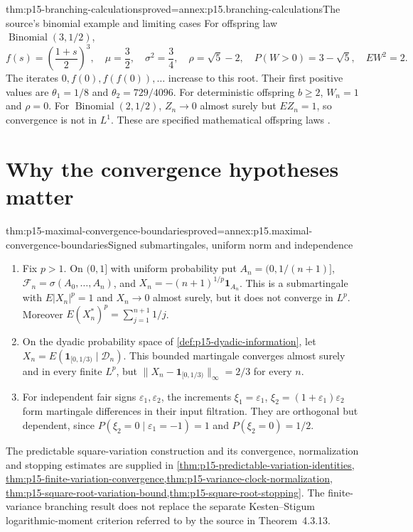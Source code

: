 \begin{hbtheorem}{thm:p15-branching-calculations}{proved=annex:p15.branching-calculations}{The source's binomial example and limiting cases}
For offspring law \(\operatorname{Binomial}(3,1/2)\),
\[
   f(s)=\left(\frac{1+s}{2}\right)^3,\quad
   \mu=\frac32,\quad \sigma^2=\frac34,\quad
   \rho=\sqrt5-2,\quad P(W>0)=3-\sqrt5,\quad EW^2=2.
\]
The iterates \(0,f(0),f(f(0)),\ldots\) increase to this root.
Their first positive values are \(\theta_1=1/8\) and
\(\theta_2=729/4096\).
For deterministic offspring \(b\geq2\), \(W_n=1\) and \(\rho=0\).
For \(\operatorname{Binomial}(2,1/2)\), \(Z_n\to0\) almost surely
but \(EZ_n=1\), so convergence is not in \(L^1\).
These are specified mathematical offspring laws
\cite[ex.~4.3.13 and figs.~4.3--4.4]{DurrettPTEAuthor2019}.
\end{hbtheorem}

\section{Why the convergence hypotheses matter}
\label{sec:p15-maximal-convergence-boundaries}

\begin{hbtheorem}{thm:p15-maximal-convergence-boundaries}{proved=annex:p15.maximal-convergence-boundaries}{Signed submartingales, uniform norm and independence}
\begin{enumerate}
\item Fix \(p>1\). On \((0,1]\) with uniform probability put
      \(A_n=(0,1/(n+1)]\), \(\mathcal F_n=\sigma(A_0,\ldots,A_n)\), and
      \(X_n=-(n+1)^{1/p}\mathbf1_{A_n}\).
      This is a submartingale with \(E|X_n|^p=1\) and \(X_n\to0\)
      almost surely, but it does not converge in \(L^p\).
      Moreover \(E(X_n^*)^p=\sum_{j=1}^{n+1}1/j\).
\item On the dyadic probability space of
      \cref{def:p15-dyadic-information}, let
      \(X_n=E(\mathbf1_{[0,1/3)}\mid\mathcal D_n)\).
      This bounded martingale converges almost surely and in every
      finite \(L^p\), but
      \(\|X_n-\mathbf1_{[0,1/3)}\|_\infty=2/3\) for every \(n\).
\item For independent fair signs \(\varepsilon_1,\varepsilon_2\),
      the increments
      \(\xi_1=\varepsilon_1\), \(\xi_2=(1+\varepsilon_1)\varepsilon_2\)
      form martingale differences in their input filtration.
      They are orthogonal but dependent, since
      \(P(\xi_2=0\mid\varepsilon_1=-1)=1\) and \(P(\xi_2=0)=1/2\).
\end{enumerate}
\end{hbtheorem}

The predictable square-variation construction and its convergence,
normalization and stopping estimates are supplied in
\cref{thm:p15-predictable-variation-identities,
thm:p15-finite-variation-convergence,thm:p15-variance-clock-normalization,
thm:p15-square-root-variation-bound,thm:p15-square-root-stopping}.
The finite-variance branching result does not replace the
separate Kesten--Stigum logarithmic-moment criterion referred to by the
source in Theorem~4.3.13.

